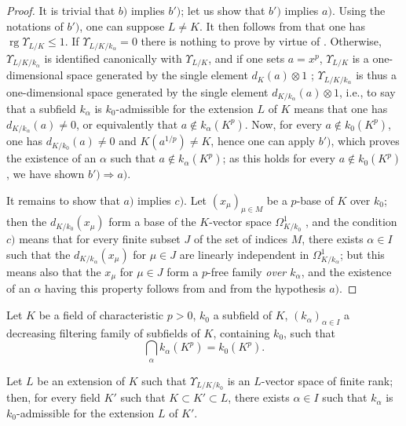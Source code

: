 \begin{proof}
It is trivial that $b)$ implies $b')$; let us show that $b')$ implies $a)$.
Using the notations of $b')$, one can suppose $L\neq K$.
It then follows from  that one has $\operatorname{rg}\Upsilon_{L/K}\leqslant 1$.
If $\Upsilon_{L/K/k_\alpha}=0$ there is nothing to prove by virtue of .
Otherwise, $\Upsilon_{L/K/k_\alpha}$ is identified canonically with $\Upsilon_{L/K}$, and if one sets $a=x^p$, $\Upsilon_{L/K}$ is a one-dimensional space generated by the single element $d_K(a)\otimes 1$ ; $\Upsilon_{L/K/k_\alpha}$ is thus a one-dimensional space generated by the single element $d_{K/k_\alpha}(a)\otimes 1$, i.e., to say that a subfield $k_\alpha$ is $k_0$-admissible for the extension $L$ of $K$ means that one has $d_{K/k_\alpha}(a)\neq 0$, or equivalently  that $a\notin k_\alpha(K^p)$.
Now, for every $a\notin k_0(K^p)$, one has $d_{K/k_0}(a)\neq 0$ and $K(a^{1/p})\neq K$, hence one can apply $b')$, which proves the existence of an $\alpha$ such that $a\notin k_\alpha(K^p)$; as this holds for every $a\notin k_0(K^p)$, we have shown $b')\Rightarrow a)$.

It remains to show that $a)$ implies $c)$.
Let $(x_\mu)_{\mu\in M}$ be a $p$-base of $K$ over $k_0$; then the $d_{K/k_0}(x_\mu)$ form a base of the $K$-vector space $\Omega^1_{K/k_0}$ , and the condition $c)$ means that for every finite subset $J$ of the set of indices $M$, there exists $\alpha\in I$ such that the $d_{K/k_\alpha}(x_\mu)$ for $\mu\in J$ are linearly independent in $\Omega^1_{K/k_\alpha}$; but this means also  that the $x_\mu$ for $\mu\in J$ form a $p$-free family \emph{over $k_\alpha$}, and the existence of an $\alpha$ having this property follows from  and from the hypothesis $a)$.
\end{proof}


\begin{corollary}[21.8.4]
\label{0.21.8.4}
Let $K$ be a field of characteristic $p>0$, $k_0$ a subfield of $K$, $(k_\alpha)_{\alpha\in I}$ a decreasing filtering family of subfields of $K$, containing $k_0$, such that
\[
  \bigcap_\alpha k_\alpha(K^p)=k_0(K^p).
\]

Let $L$ be an extension of $K$ such that $\Upsilon_{L/K/k_0}$ is an $L$-vector space of finite rank; then, for every field $K'$ such that $K\subset K'\subset L$, there exists $\alpha\in I$ such that $k_\alpha$ is $k_0$-admissible for the extension $L$ of $K'$.
\end{corollary}

